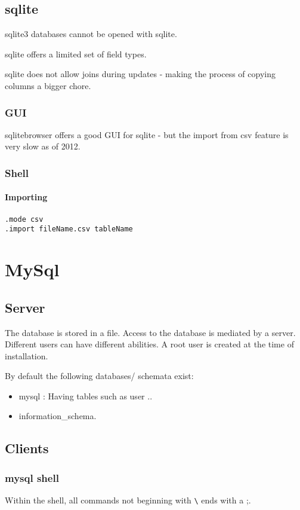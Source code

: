 \section{sqlite}
sqlite3 databases cannot be opened with sqlite.

sqlite offers a limited set of field types.

sqlite does not allow joins during updates - making the process of copying columns a bigger chore.

\subsection{GUI}
sqlitebrowser offers a good GUI for sqlite - but the import from csv feature is very slow as of 2012.

\subsection{Shell}
\subsubsection{Importing}
\begin{verbatim}
.mode csv
.import fileName.csv tableName
\end{verbatim}




\chapter{MySql}
\section{Server}
The database is stored in a file. Access to the database is mediated by a server. Different users can have different abilities. A root user is created at the time of installation.

By default the following databases/ schemata exist:
\begin{itemize}
 \item mysql : Having tables such as user ..
 \item information\_schema.
\end{itemize}


\section{Clients}
\subsection{mysql shell}
Within the shell, all commands not beginning with \verb'\' ends with a ;.

